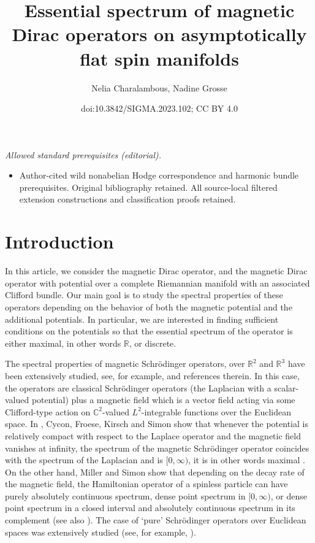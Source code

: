 \documentclass[10pt,a4paper]{amsart}
\title{Essential spectrum of magnetic Dirac operators on asymptotically flat spin manifolds}
\author{Nelia Charalambous, Nadine Grosse}
\date{doi:10.3842/SIGMA.2023.102; CC BY 4.0}
\numberwithin{equation}{section}
\begin{document}
\maketitle
\noindent\textit{Allowed standard prerequisites (editorial).}\begin{itemize}
\item Author-cited wild nonabelian Hodge correspondence and harmonic bundle prerequisites. Original bibliography retained. All source-local filtered extension constructions and classification proofs retained.
\end{itemize}\medskip
\section{Introduction}

In this article, we consider the magnetic Dirac operator, and the magnetic Dirac operator with potential over a complete Riemannian manifold with an associated Clifford bundle. Our main goal is to study the spectral properties of these operators depending on the behavior of both the magnetic potential and the additional potentials. In particular, we are interested in finding sufficient conditions on the potentials so that the essential spectrum of the operator is either maximal, in other words ${\mathbb R}$, or discrete.

The spectral properties of magnetic Schr\"odinger operators, over $\mathbb{R}^2$ and $\mathbb{R}^3$ have been extensively studied, see, for example, \cite{CFKS, Helffer, shi} and references therein. In this case, the operators are classical Schr\"odinger operators (the Laplacian with a scalar-valued potential) plus a magnetic field which is a vector field acting via some Clifford-type action on $\mathbb C^2$-valued $L^2$-integrable functions over the Euclidean space. In \cite{CFKS}, Cycon, Froese, Kirsch and Simon show that whenever the potential is relatively compact with respect to the
Laplace operator and the magnetic field vanishes at infinity, the spectrum of the magnetic Schr\"odinger operator coincides with the spectrum of the Laplacian and is $[0,\infty)$, it is in other words maximal \cite[Theorem~6.1]{CFKS}. On the other hand, Miller and Simon show that depending on the decay rate of the magnetic field, the Hamiltonian operator of a spinless particle can have purely absolutely continuous spectrum, dense point spectrum in $[0,\infty)$, or dense point spectrum in a closed interval and absolutely continuous spectrum in its complement \cite{MS} (see also \cite[Theorem~6.2]{CFKS}). The case of `pure' Schr\"odinger operators over Euclidean spaces was extensively studied (see, for example, \cite{Agmon, simon}).
\end{document}
